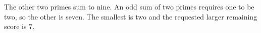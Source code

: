 The other two primes sum to nine. An odd sum of two primes requires one to be two, so the other is seven. The smallest is two and the requested larger remaining score is $\boxed7$.
